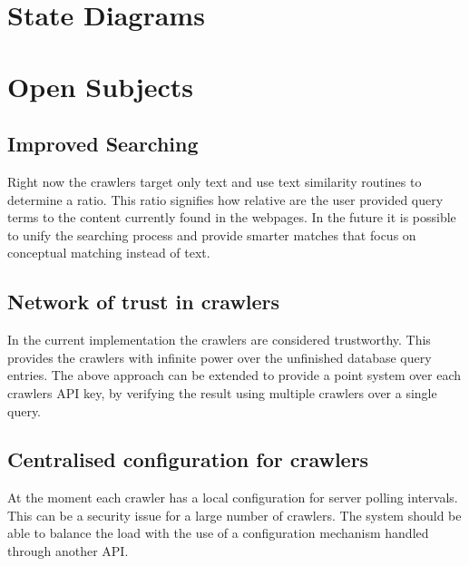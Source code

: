 \chapter{State Diagrams}

\chapter{Open Subjects}
    \section{Improved Searching}
        Right now the crawlers target only text and use text similarity
        routines to determine a ratio. This ratio signifies how relative are
        the user provided query terms to the content currently found in the
        webpages. In the future it is possible to unify the searching process
        and provide smarter matches that focus on conceptual matching instead
        of text.
    \section{Network of trust in crawlers}
        In the current implementation the crawlers are considered trustworthy.
        This provides the crawlers with infinite power over the unfinished
        database query entries. The above approach can be extended to provide
        a point system over each crawlers API key, by verifying the result
        using multiple crawlers over a single query.
    \section{Centralised configuration for crawlers}
        At the moment each crawler has a local configuration for server
        polling intervals. This can be a security issue for a large number of
        crawlers. The system should be able to balance the load with the use
        of a configuration mechanism handled through another API.

